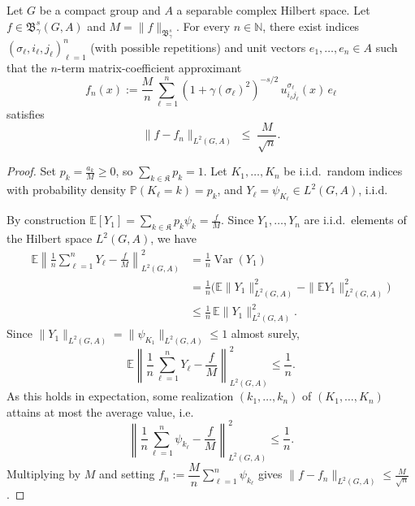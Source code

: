 \documentclass[10pt,a4paper]{amsart}
\def\Var{\mathop{Var}}
\begin{document}
\begin{theorem}\label{thm:main}
Let $G$ be a compact group and $A$ a separable complex Hilbert space. Let  $f \in \mathfrak{B}^s_\gamma(G,A)$ and $M = \|f\|_{\mathfrak{B}^s_\gamma}$. For every $n \in \mathbb{N}$, 
there exist indices $(\sigma_\ell,i_\ell,j_\ell)_{\ell=1}^n$ (with possible
repetitions) and unit vectors $e_1,\dots,e_n \in A$ such that the $n$-term
matrix-coefficient approximant
\[
f_n(x) := \frac{M}{n} \sum_{\ell=1}^n
(1+\gamma(\sigma_\ell)^2)^{-s/2}\, u^{\sigma_\ell}_{i_\ell j_\ell}(x)\, e_\ell
\]
satisfies
$$
\|f - f_n\|_{L^2(G,A)} \;\le\; \frac{M}{\sqrt n}.
$$
\end{theorem}

\begin{proof}
Set $p_k = \frac{a_k}{M} \ge 0$, so $\sum\limits_{k\in\mathfrak{K}} p_k = 1$.
Let $K_1,\dots,K_n$ be i.i.d.\ random indices with probability density $\mathbb{P}(K_\ell=k)=p_k$,
and  $Y_\ell = \psi_{K_\ell} \in L^2(G,A)$, i.i.d.
 
By construction $\mathbb{E}[Y_1] = \sum\limits_{k\in\mathfrak{K}} p_k \psi_k = \frac{f}{M}$. Since
$Y_1,\dots,Y_n$ are i.i.d.\ elements of the Hilbert space $L^2(G,A)$, we have
\begin{align*}
\mathbb{E}\left\| \frac{1}{n}\sum_{\ell=1}^n Y_\ell - \frac{f}{M} \right\|_{L^2(G,A)}^2
&= \frac1n \Var(Y_1)\\
&= \frac1n \Big( \mathbb{E}\|Y_1\|_{L^2(G,A)}^2 - \|\mathbb{E} Y_1\|_{L^2(G,A)}^2 \Big)\\
&\le \frac1n\, \mathbb{E}\|Y_1\|_{L^2(G,A)}^2.
\end{align*}
Since $\|Y_1\|_{L^2(G,A)} = \|\psi_{K_1}\|_{L^2(G,A)} \le 1$ almost surely,
\[
\mathbb{E}\left\| \frac1n\sum_{\ell=1}^n Y_\ell - \frac{f}{M} \right\|_{L^2(G,A)}^2 \le \frac1n .
\]
As this holds in expectation, some realization $(k_1,\dots,k_n)$ of
$(K_1,\dots,K_n)$ attains at most the average value, i.e.
\[
\left\| \frac1n \sum_{\ell=1}^n \psi_{k_\ell} - \frac{f}{M} \right\|_{L^2(G,A)}^2
\le \frac1n .
\]
Multiplying by $M$ and setting $f_n := \dfrac{M}{n}\sum_{\ell=1}^n \psi_{k_\ell}$
gives $\|f-f_n\|_{L^2(G,A)} \le\frac{M}{\sqrt {n}}$. 
\end{proof}
\end{document}
